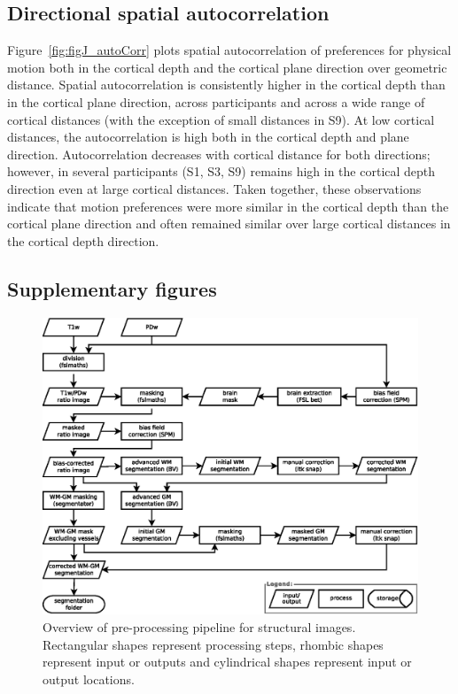 \subsection{Directional spatial autocorrelation}
\label{sec:auto}
Figure~\ref{fig:figJ_autoCorr} plots spatial autocorrelation of preferences for physical motion both in the cortical depth and the cortical plane direction over geometric distance. Spatial autocorrelation is consistently higher in the cortical depth than in the cortical plane direction, across participants and across a wide range of cortical distances (with the exception of small distances in S9). At low cortical distances, the autocorrelation is high both in the cortical depth and plane direction. Autocorrelation decreases with cortical distance for both directions; however, in several participants (S1, S3, S9) remains high in the cortical depth direction even at large cortical distances. Taken together, these observations indicate that motion preferences were more similar in the cortical depth than the cortical plane direction and often remained similar over large cortical distances in the cortical depth direction.

\beginsupplement

\clearpage
\subsection{Supplementary figures}

\begin{figure}[htbp!]
\centering
\includegraphics[width=\textwidth]{figures/chapter_03_SI/figS11a.eps}
\caption{Overview of pre-processing pipeline for structural images. Rectangular shapes represent processing steps, rhombic shapes represent input or outputs and cylindrical shapes represent input or output locations.}
\label{fig:figA_proc}
\end{figure}

